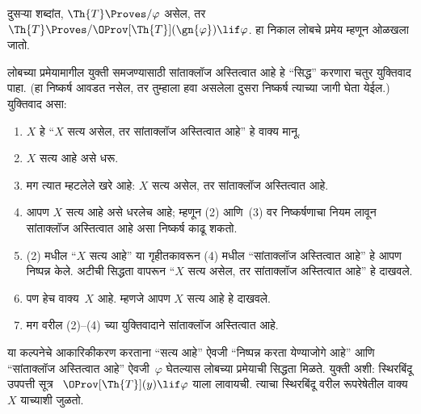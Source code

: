 दुसऱ्या शब्दांत,
$\Th{T} \Proves/ \varphi$
असेल, तर
$\Th{T} \Proves/
\OProv[\Th{T}](\gn{\varphi}) \lif \varphi$.
हा निकाल लोबचे
प्रमेय म्हणून ओळखला
जातो.

\begin{explain}
लोबच्या प्रमेयामागील
युक्ती समजण्यासाठी
सांताक्लॉज अस्तित्वात
आहे हे “सिद्ध”
करणारा चतुर युक्तिवाद
पाहा. (हा निष्कर्ष
आवडत नसेल, तर
तुम्हाला हवा असलेला
दुसरा निष्कर्ष
त्याच्या जागी
घेता येईल.)
युक्तिवाद असा:
\begin{enumerate}
\item $X$ हे “$X$
  सत्य असेल, तर
  सांताक्लॉज
  अस्तित्वात आहे”
  हे वाक्य मानू.
\item $X$ सत्य आहे
  असे धरू.
\item मग त्यात
  म्हटलेले खरे आहे:
  $X$ सत्य असेल,
  तर सांताक्लॉज
  अस्तित्वात आहे.
\item आपण $X$ सत्य
  आहे असे धरलेच
  आहे; म्हणून
  (2) आणि~(3)
  वर निष्कर्षणाचा
  नियम लावून
  सांताक्लॉज
  अस्तित्वात आहे
  असा निष्कर्ष
  काढू शकतो.
\item (2) मधील
  “$X$ सत्य आहे”
  या गृहीतकावरून
  (4) मधील
  “सांताक्लॉज
  अस्तित्वात आहे”
  हे आपण निष्पन्न
  केले. अटीची
  सिद्धता वापरून
  “$X$ सत्य असेल,
  तर सांताक्लॉज
  अस्तित्वात आहे”
  हे दाखवले.
\item पण हेच
  वाक्य~$X$ आहे.
  म्हणजे आपण
  $X$ सत्य आहे
  हे दाखवले.
\item मग वरील
  (2)--(4) च्या
  युक्तिवादाने
  सांताक्लॉज
  अस्तित्वात आहे.
\end{enumerate}
या कल्पनेचे
आकारिकीकरण करताना
“सत्य आहे” ऐवजी
“निष्पन्न करता येण्याजोगे आहे”
आणि “सांताक्लॉज
अस्तित्वात आहे”
ऐवजी~$\varphi$
घेतल्यास लोबच्या
प्रमेयाची सिद्धता
मिळते. युक्ती अशी:
स्थिरबिंदू उपपत्ती
सूत्र~
$\OProv[\Th{T}](y) \lif \varphi$
याला लावायची.
त्याचा स्थिरबिंदू
वरील रूपरेषेतील
वाक्य~$X$
याच्याशी जुळतो.
\end{explain}

